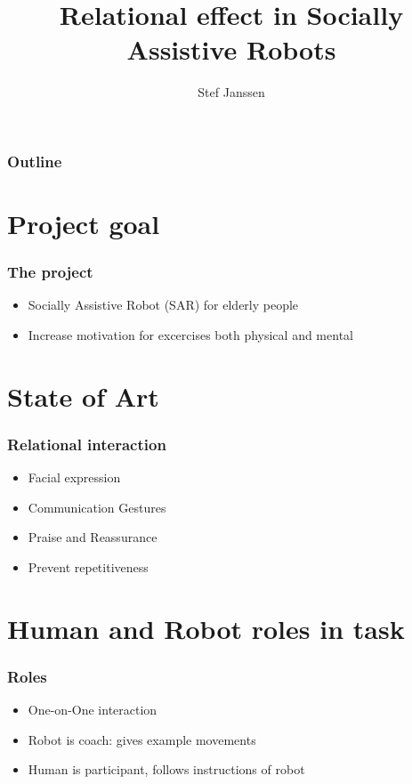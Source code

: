 \documentclass{beamer}
\title[RU style for Beamer]{
  Relational effect in Socially Assistive Robots}
\author[Pim Vullers MSc]{
  Stef Janssen }
\begin{document}
\begin{frame}
  \titlepage
\end{frame}

\begin{frame}
  \frametitle{Outline}

  \tableofcontents
\end{frame}



\section{Project goal}

\begin{frame}
  \frametitle{The project}

  \begin{itemize}
    \item Socially Assistive Robot (SAR) for elderly people 
    \item Increase motivation for excercises both physical and mental
  \end{itemize}
\end{frame}

\section{State of Art}

\begin{frame}
  \frametitle{Relational interaction}

  \begin{itemize}
    \item Facial expression
    \item Communication Gestures
    \item Praise and Reassurance
    \item Prevent repetitiveness
  \end{itemize}
\end{frame}

\section{Human and Robot roles in task}

\begin{frame}
  \frametitle{Roles}

  \begin{itemize}
    \item One-on-One interaction
    \item Robot is coach: gives example movements
    \item Human is participant, follows instructions of robot
  \end{itemize}

\end{frame}
\end{document}
